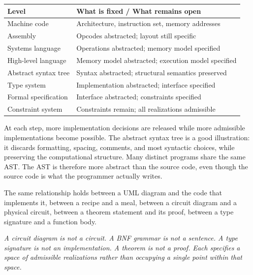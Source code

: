 \documentclass[12pt]{article}
\begin{document}
\begin{center}
\renewcommand{\arraystretch}{1.3}
\begin{tabular}{ll}
\hline
\textbf{Level} & \textbf{What is fixed / What remains open} \\
\hline
Machine code        & Architecture, instruction set, memory addresses \\
Assembly            & Opcodes abstracted; layout still specific \\
Systems language    & Operations abstracted; memory model specified \\
High-level language & Memory model abstracted; execution model specified \\
Abstract syntax tree & Syntax abstracted; structural semantics preserved \\
Type system         & Implementation abstracted; interface specified \\
Formal specification & Interface abstracted; constraints specified \\
Constraint system   & Constraints remain; all realizations admissible \\
\hline
\end{tabular}
\end{center}

\medskip

At each step, more implementation decisions are released while more admissible implementations become possible. The abstract syntax tree is a good illustration: it discards formatting, spacing, comments, and most syntactic choices, while preserving the computational structure. Many distinct programs share the same AST. The AST is therefore more abstract than the source code, even though the source code is what the programmer actually writes.

The same relationship holds between a UML diagram and the code that implements it, between a recipe and a meal, between a circuit diagram and a physical circuit, between a theorem statement and its proof, between a type signature and a function body.

\begin{mdframed}[backgroundcolor=quoteblock,linewidth=0pt,innerleftmargin=12pt,innerrightmargin=12pt,innertopmargin=8pt,innerbottommargin=8pt]
\textit{A circuit diagram is not a circuit. A BNF grammar is not a sentence. A type signature is not an implementation. A theorem is not a proof. Each specifies a space of admissible realizations rather than occupying a single point within that space.}
\end{mdframed}
\end{document}
